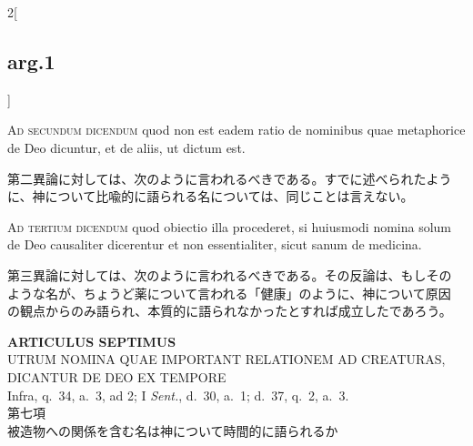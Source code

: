\documentclass[paper=a4paper,fontsize=10pt,jafontsize=9pt,titlepage]{jlreq}
\begin{document}
\begin{paracol}{2}[\subsection{arg.1}]
\switchcolumn*[\subsection{ad.2}]

{\scshape Ad secundum dicendum} quod non est eadem ratio de nominibus
quae metaphorice de Deo dicuntur, et de aliis, ut dictum est.

\switchcolumn

第二異論に対しては、次のように言われるべきである。すでに述べられたよう
に、神について比喩的に語られる名については、同じことは言えない。

\switchcolumn*[\subsection{ad.3}]

{\scshape Ad tertium dicendum} quod obiectio illa procederet, si
huiusmodi nomina solum de Deo causaliter dicerentur et non
essentialiter, sicut sanum de medicina.

\switchcolumn

第三異論に対しては、次のように言われるべきである。その反論は、もしその
ような名が、ちょうど薬について言われる「健康」のように、神について原因
の観点からのみ語られ、本質的に語られなかったとすれば成立したであろう。

\end{paracol}
\newpage
{}

\begin{center}
{\Large {\bfseries ARTICULUS SEPTIMUS}}\\
{\large UTRUM NOMINA QUAE IMPORTANT RELATIONEM AD CREATURAS, DICANTUR
DE DEO EX TEMPORE}\\
{\footnotesize Infra, q.~34, a.~3, ad 2; I {\itshape Sent.}, d.~30,
a.~1; d.~37, q.~2, a.~3.}\\
{\Large 第七項\\被造物への関係を含む名は神について時間的に語られるか}
\end{center}

{}
\setcounter{section}{7}
\setcounter{subsection}{0}
\end{document}
